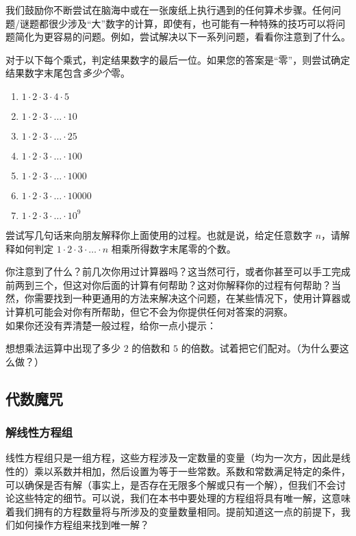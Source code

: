 我们鼓励你不断尝试在脑海中或在一张废纸上执行遇到的任何算术步骤。任何问题/谜题都很少涉及``大''数字的计算，即使有，也可能有一种特殊的技巧可以将问题简化为更容易的问题。例如，尝试解决以下一系列问题，看看你注意到了什么。

\begin{problem}
    对于以下每个乘式，判定结果数字的最后一位。如果您的答案是``零''，则尝试确定结果数字末尾包含\textit{多少个}零。
    \begin{enumerate}
        \item $1 \cdot 2 \cdot 3 \cdot 4 \cdot 5$
        \item $1 \cdot 2 \cdot 3 \cdot \dots \cdot 10$
        \item $1 \cdot 2 \cdot 3 \cdot \dots \cdot 25$
        \item $1 \cdot 2 \cdot 3 \cdot \dots \cdot 100$
        \item $1 \cdot 2 \cdot 3 \cdot \dots \cdot 1000$
        \item $1 \cdot 2 \cdot 3 \cdot \dots \cdot 10000$
        \item $1 \cdot 2 \cdot 3 \cdot \dots \cdot 10^9$
    \end{enumerate}
    尝试写几句话来向朋友解释你上面使用的过程。也就是说，给定任意数字 $n$，请解释如何判定 $1\cdot2\cdot3\cdot \dots \cdot n$ 相乘所得数字末尾零的个数。
\end{problem}

你注意到了什么？前几次你用过计算器吗？这当然可行，或者你甚至可以手工完成前两到三个，但这对你后面的计算有何帮助？这对你解释你的过程有何帮助？当然，你需要找到一种更通用的方法来解决这个问题，在某些情况下，使用计算器或计算机可能会对你有所帮助，但它不会为你提供任何对答案的洞察。\\
如果你还没有弄清楚一般过程，给你一点小提示：
\begin{hint}
    想想乘法运算中出现了多少 $2$ 的倍数和 $5$ 的倍数。试着把它们配对。（为什么要这么做？）
\end{hint}

\subsection{代数魔咒}

\subsubsection*{解线性方程组}

线性方程组只是一组方程，这些方程涉及一定数量的变量（均为一次方，因此是线性的）乘以系数并相加，然后设置为等于一些常数。系数和常数满足特定的条件，可以确保是否有解（事实上，是否存在无限多个解或只有一个解），但我们不会讨论这些特定的细节。可以说，我们在本书中要处理的方程组将具有唯一解，这意味着我们拥有的方程数量将与所涉及的变量数量相同。提前知道这一点的前提下，我们如何操作方程组来找到唯一解？

